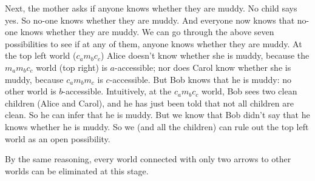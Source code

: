 Next, the mother asks if anyone knows whether they are muddy. No child says yes.
So no-one knows whether they are muddy. And everyone now knows that no-one knows
whether they are muddy. We can go through the above seven possibilities to see
if at any of them, anyone knows whether they are muddy. At the top left world
($c_am_bc_c$) Alice doesn't know whether she is muddy, because the $m_am_bc_c$
world (top right) is $a$-accessible; nor does Carol know whether she is muddy,
because $c_am_bm_c$ is $c$-accessible. But Bob knows that he is muddy: no other
world is $b$-accessible. Intuitively, at the $c_am_bc_c$ world, Bob sees two
clean children (Alice and Carol), and he has just been told that not all
children are clean. So he can infer that he is muddy. But we know that Bob
didn't say that he knows whether he is muddy. So we (and all the children) can
rule out the top left world as an open possibility.

By the same reasoning, every world connected with only two arrows to other
worlds can be eliminated at this stage.

\begin{center}
\end{center}


